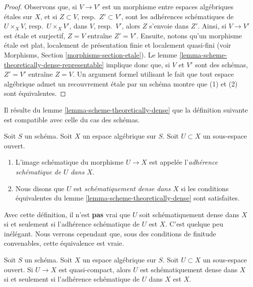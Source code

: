 \begin{proof}
Observons que, si $V \to V'$ est un morphisme entre espaces algébriques étales
sur $X$, et si $Z \subset V$, resp.\ $Z' \subset V'$, sont les adhérences schématiques
de $U \times_X V$, resp.\ $U \times_X V'$, dans $V$, resp.\ $V'$,
alors $Z$ s'envoie dans $Z'$. Ainsi, si $V \to V'$ est étale et surjectif,
$Z = V$ entraîne $Z' = V'$. Ensuite, notons qu'un morphisme étale est
plat, localement de présentation finie et localement quasi-fini
(voir Morphisms, Section \ref{morphisms-section-etale}).
Le lemme \ref{lemma-scheme-theoretically-dense-representable}
implique donc que, si $V$ et $V'$ sont des schémas, $Z' = V'$ entraîne
$Z = V$. Un argument formel utilisant le fait que tout espace algébrique admet un
recouvrement étale par un schéma montre que (1) et (2) sont équivalentes.
\end{proof}

\noindent
Il résulte du
lemme \ref{lemma-scheme-theoretically-dense}
que la définition suivante est compatible avec celle
du cas des schémas.

\begin{definition}
\label{definition-scheme-theoretically-dense}
Soit $S$ un schéma.
Soit $X$ un espace algébrique sur $S$.
Soit $U \subset X$ un sous-espace ouvert.
\begin{enumerate}
\item L'image schématique du morphisme $U \to X$
est appelée l'{\it adhérence schématique de $U$ dans $X$}.
\item Nous disons que $U$ est {\it schématiquement dense dans $X$}
si les conditions équivalentes du
lemme \ref{lemma-scheme-theoretically-dense} sont satisfaites.
\end{enumerate}
\end{definition}

\noindent
Avec cette définition, il n'est {\bf pas} vrai que $U$ soit schématiquement
dense dans $X$ si et seulement si l'adhérence schématique
de $U$ est $X$. C'est quelque peu inélégant. Nous verrons cependant que,
sous des conditions de finitude convenables, cette équivalence est vraie.

\begin{lemma}
\label{lemma-scheme-theoretically-dense-quasi-compact}
Soit $S$ un schéma. Soit $X$ un espace algébrique sur $S$.
Soit $U \subset X$ un sous-espace ouvert.
Si $U \to X$ est quasi-compact, alors $U$
est schématiquement dense dans $X$ si et seulement si l'adhérence schématique
de $U$ dans $X$ est $X$.
\end{lemma}

